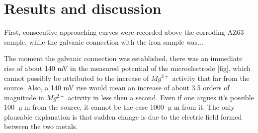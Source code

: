 \documentclass[3p]{elsarticle}
\begin{document}
\section{Results and discussion}

First, consecutive approaching curves were recorded above the corroding AZ63 sample, while the galvanic connection with the iron sample was...

The moment the galvanic connection was established, there was an immediate rise of about 140 mV in the measured potential of the microelectrode [fig], which cannot possibly be attributed to the increase of $Mg^{2+}$ activity that far from the source. Also, a 140 mV rise would mean an increase of about 3.5 orders of magnitude in $Mg^{2+}$ activity in less then a second. Even if one argues it's possible 100 $\upmu$m from the source, it cannot be the case 1000 $\upmu$m from it. The only plausable explanation is that sudden change is due to the electric field formed between the two metals. 
\end{document}
